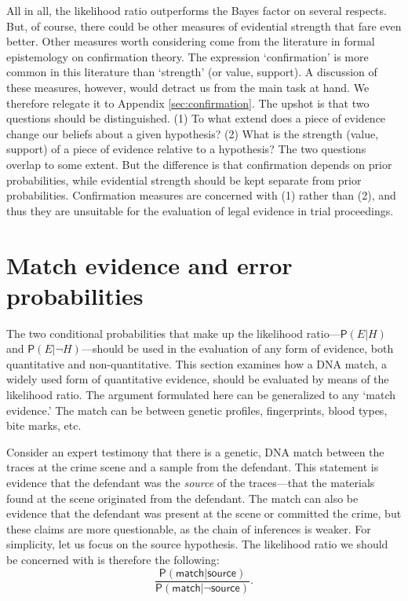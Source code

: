 \documentclass[
  10pt,
  dvipsnames,enabledeprecatedfontcommands]{scrartcl}
\newcommand{\pr}[1]{\mathsf{P}(#1)}
\begin{document}
\normalsize

All in all, the likelihood ratio outperforms the Bayes factor on several
respects. But, of course, there could be other measures of evidential
strength that fare even better. Other measures worth considering come
from the literature in formal epistemology on confirmation theory. The
expression `confirmation' is more common in this literature than
`strength' (or value, support). A discussion of these measures, however,
would detract us from the main task at hand. We therefore relegate it to
Appendix \ref{sec:confirmation}. The upshot is that two questions should
be distinguished. (1) To what extend does a piece of evidence change our
beliefs about a given hypothesis? (2) What is the strength (value,
support) of a piece of evidence relative to a hypothesis? The two
questions overlap to some extent. But the difference is that
confirmation depends on prior probabilities, while evidential strength
should be kept separate from prior probabilities. Confirmation measures
are concerned with (1) rather than (2), and thus they are unsuitable for
the evaluation of legal evidence in trial proceedings.

\hypertarget{match-evidence-and-error-probabilities}{%
\section{\texorpdfstring{Match evidence and error probabilities
\label{sec:fp}}{Match evidence and error probabilities }}\label{match-evidence-and-error-probabilities}}

The two conditional probabilities that make up the likelihood
ratio---\(\pr{E \vert H}\) and \(\pr{E \vert \neg H}\)---should be used
in the evaluation of any form of evidence, both quantitative and
non-quantitative. This section examines how a DNA match, a widely used
form of quantitative evidence, should be evaluated by means of the
likelihood ratio. The argument formulated here can be generalized to any
`match evidence.' The match can be between genetic profiles,
fingerprints, blood types, bite marks, etc.

Consider an expert testimony that there is a genetic, DNA match between
the traces at the crime scene and a sample from the defendant. This
statement is evidence that the defendant was the \textit{source} of the
traces---that the materials found at the scene originated from the
defendant. The match can also be evidence that the defendant was present
at the scene or committed the crime, but these claims are more
questionable, as the chain of inferences is weaker. For simplicity, let
us focus on the source hypothesis. The likelihood ratio we should be
concerned with is therefore the following:
\[\frac{\pr{\textsf{match} \vert \textsf{source}}}{\pr{\textsf{match} \vert \neg \textsf{source}}}.\]
\end{document}
